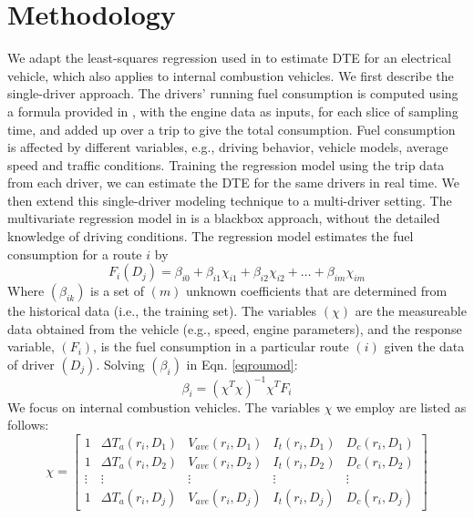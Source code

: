 \section{Methodology}

We adapt the least-squares regression used in \cite{rodgersetal2013} to estimate DTE for an electrical vehicle, which also applies to internal combustion vehicles. We first describe the single-driver approach. The drivers' running fuel consumption is computed using a formula provided in \cite{lightner2013}, with the engine data as inputs, for each slice of sampling time, and added up over a trip to give the total consumption. Fuel consumption is affected by different variables, e.g., driving behavior, vehicle models, average speed and traffic conditions. Training the regression model using the trip data from each driver, we can estimate the DTE for the same drivers in real time.
We then extend this single-driver modeling technique to a multi-driver setting. The multivariate regression model in \cite{freund2006} is a blackbox approach, without the detailed knowledge of driving conditions. The regression model estimates the fuel consumption for a route \(i\) by
\begin{equation}
F_i(D_j) = \beta_{i0} + \beta_{i1} \chi_{i1} + \beta_{i2} \chi_{i2} + \ldots + \beta_{im} \chi_{im}
\label{eqroumod}
\end{equation}
Where $(\beta_{ik})$ is a set of $(m)$ unknown coefficients that are determined from the historical data (i.e., the training set). The variables $(\chi)$ are the measureable data obtained from the vehicle (e.g., speed, engine parameters), and the response variable, $(F_i)$, is the fuel consumption in a particular route $(i)$ given the data of driver $(D_j)$.
Solving $(\beta_i)$ in Eqn. \ref{eqroumod}:
\begin{equation}
\beta_i = (\chi^T \chi)^{-1} \chi^T F_i
\label{eqsolbeta}
\end{equation}
We focus on internal combustion vehicles.
The variables \(\chi\) we employ are listed as follows:
\[
\chi = \begin{bmatrix}
	1 & \Delta T_a(r_i,D_1) & V_{ave}(r_i,D_1) & I_{t}(r_i,D_1) & D_{c}(r_i,D_1) \\[0.3em]
	1 & \Delta T_a(r_i,D_2) & V_{ave}(r_i,D_2) & I_{t}(r_i,D_2) & D_{c}(r_i,D_2) \\[0.3em]
	\vdots & \vdots & \vdots & \vdots & \vdots \\[0.3em]
	1 & \Delta T_a(r_i,D_j) & V_{ave}(r_i,D_j) & I_{t}(r_i,D_j) & D_{c}(r_i,D_j)
	\end{bmatrix}
\label{eqchimatrix}
\]

